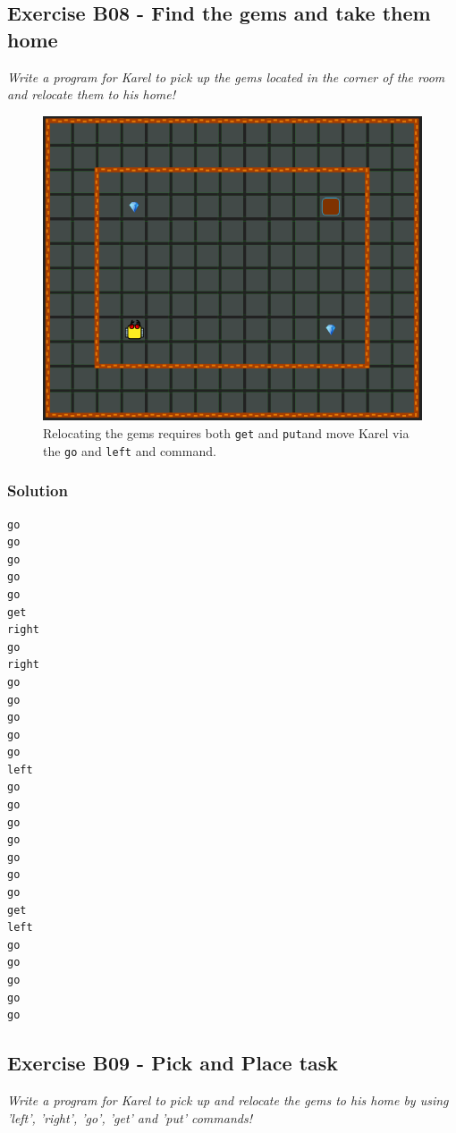 \documentclass[article,A4,12pt]{llncs}
\begin{document}
{{\subsection{Exercise B08 - Find the gems and take them home}

{\em Write a program for Karel to pick up the gems located in the corner of the room and relocate them to his home!}
\vspace{-5mm}
\begin{figure}[!ht]
\begin{center}
\includegraphics[height=0.4\textwidth]{imgk/a24.png}
\end{center}
\vspace{-4mm}
\caption{Relocating the gems requires both {\tt get} and {\tt put}and move Karel via the {\tt go} and {\tt left} and {\tt } command.}
\label{fig:b08}
\vspace{-4mm}
\end{figure}

\subsubsection{Solution}
\begin{verbatim}
go
go
go
go
go
get
right
go
right
go
go
go
go
go
left
go
go
go
go
go
go
go
get
left
go
go
go
go
go
\end{verbatim}
\subsection{Exercise B09 - Pick and Place task}

{\em Write a program for Karel to pick up and relocate the gems to his home by using 'left', 'right', 'go', 'get' and 'put' commands!}

}}
\end{document}
